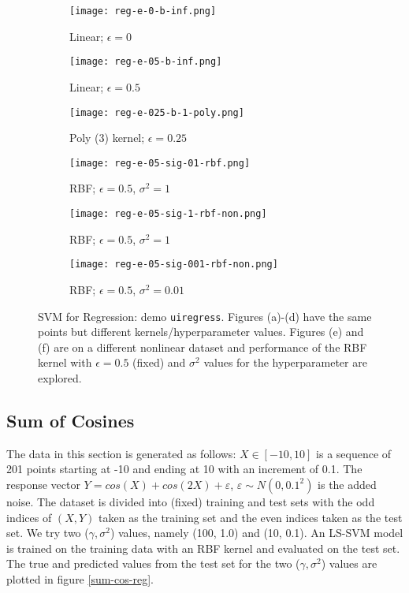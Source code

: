 \documentclass[paper=a4, fontsize=11pt]{scrartcl} %
\numberwithin{equation}{section} %
\begin{document}
\begin{figure}[ht]
\centering
	\begin{subfigure}[b]{0.3\textwidth}
		\centering
		\texttt{[image: reg-e-0-b-inf.png]}
		\caption{Linear; $\epsilon = 0$}
	\end{subfigure}%
	\begin{subfigure}[b]{0.3\textwidth}
		\centering
		\texttt{[image: reg-e-05-b-inf.png]}
		\caption{Linear; $\epsilon = 0.5$}
	\end{subfigure}%
	\begin{subfigure}[b]{0.3\textwidth}
		\centering
		\texttt{[image: reg-e-025-b-1-poly.png]}
		\caption{Poly (3) kernel; $\epsilon = 0.25$}
	\end{subfigure}
	\begin{subfigure}[b]{0.3\textwidth}
		\centering
		\texttt{[image: reg-e-05-sig-01-rbf.png]}
		\caption{RBF; $\epsilon = 0.5$, $\sigma^2 = 1$}
	\end{subfigure}%
	\begin{subfigure}[b]{0.3\textwidth}
		\centering
		\texttt{[image: reg-e-05-sig-1-rbf-non.png]}
		\caption{RBF; $\epsilon = 0.5$, $\sigma^2 = 1$}
	\end{subfigure}%
	\begin{subfigure}[b]{0.3\textwidth}
		\centering
		\texttt{[image: reg-e-05-sig-001-rbf-non.png]}
		\caption{RBF; $\epsilon = 0.5$, $\sigma^2 = 0.01$}
	\end{subfigure}
\caption{SVM for Regression: demo \texttt{uiregress}. Figures (a)-(d) have the same points but different kernels/hyperparameter values. Figures (e) and (f) are on a different nonlinear dataset and performance of the RBF kernel with $\epsilon = 0.5$ (fixed) and $\sigma^2$ values for the hyperparameter are explored.}
\label{uiregress}
\end{figure}

\subsection{Sum of Cosines}

The data in this section is generated as follows: $X \in [-10,10]$ is a sequence of 201 points starting at -10 and ending at 10 with an increment of 0.1. The response vector $Y = cos(X) + cos(2X) + \varepsilon$, $\varepsilon \sim N(0, 0.1^2)$ is the added noise. The dataset is divided into (fixed) training and test sets with the odd indices of $(X,Y)$ taken as the training set and the even indices taken as the test set. We try two ($\gamma, \sigma^2$) values, namely (100, 1.0) and (10, 0.1). An LS-SVM model is trained on the training data with an RBF kernel and evaluated on the test set. The true and predicted values from the test set for the two ($\gamma, \sigma^2$) values are plotted in figure \ref{sum-cos-reg}.\\
\end{document}
